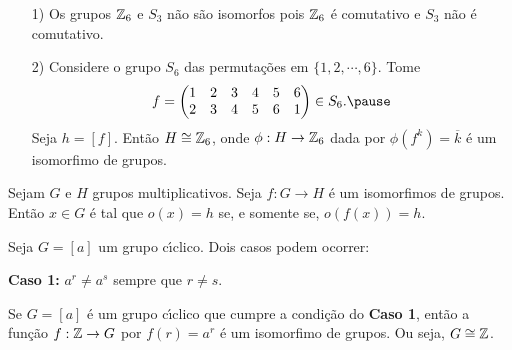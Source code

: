 \documentclass{beamer}
\begin{document}
    \begin{frame}
        \begin{exemplos}
            \vspace{.3cm}
            \begin{enumerate}
                \item[1)] Os grupos $\mathbb{Z}_6$ e $S_3$ \pause n\~ao s\~ao isomorfos \pause pois $\mathbb{Z}_6$ \'e comutativo \pause e $S_3$ n\~ao \'e comutativo.\pause

                \vspace{.3cm}

                \item[2)] Considere o grupo $S_6$ das permuta\c{c}\~oes em $\{1, 2, \cdots, 6\}$. \pause Tome
                \[
                    f = \begin{pmatrix}
                        1 & 2 & 3 & 4 & 5 & 6\\
                        2 & 3 & 4 & 5 & 6 & 1
                    \end{pmatrix} \in S_6. \pause
                \]
                Seja $h = [f]$. \pause Ent\~ao $H \cong \mathbb{Z}_6$, \pause onde $\phi : H \to \mathbb{Z}_6$ dada por $\phi(f^k) = \overline{k}$ \pause \'e um isomorfimo de grupos. \pause
                
                \vspace{.3cm}

            \end{enumerate}
        \end{exemplos}
    \end{frame}

    \begin{frame}
        \begin{proposicao}
            Sejam $G$ e $H$ grupos multiplicativos. \pause Seja $f : G \to H$ \'e um isomorfimos de grupos. \pause Ent\~ao $x \in G$ \pause \'e tal que $o(x) = h$ \pause se, e somente se, $o(f(x)) = h$.\pause
        \end{proposicao}
    \end{frame}

    \begin{frame}
        Seja $G = [a]$ um grupo c{\'\i}clico. \pause Dois casos podem ocorrer: \pause

        \textbf{Caso 1:} $a^r \ne a^s$ \pause sempre que $r \ne s$.\pause
    \end{frame}

    \begin{frame}
        \begin{proposicao}
            Se $G = [a]$ \'e um grupo c{\'\i}clico que cumpre a condi\c{c}\~ao do \textbf{Caso 1}, \pause ent\~ao a fun\c{c}\~ao $f : \mathbb{Z} \to G$ por $f(r) = a^r$ \pause \'e um isomorfimo de grupos. \pause Ou seja, $G \cong \mathbb{Z}$.\pause
        \end{proposicao}
    \end{frame}
\end{document}
